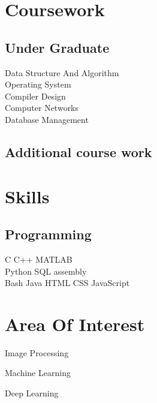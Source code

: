\documentclass[]{deedy-resume-openfont}
\begin{document}
\begin{minipage}[t]{0.32\textwidth}
\section{Coursework}
\subsection{Under Graduate}
Data Structure And Algorithm \\
Operating System \\
Compiler Design \\
Computer Networks \\
Database Management \\

\sectionsep

\subsection{Additional course work}
\sectionsep



\section{Skills}
\subsection{Programming}
\textbullet{} C \textbullet{}  C++ \textbullet{} MATLAB  \\
\textbullet{}Python \textbullet{} SQL \textbullet{} \textbullet{} assembly \\
\textbullet{}Bash \textbullet{} Java \textbullet{} HTML \textbullet{} CSS \textbullet{} JavaScript
\sectionsep

\section{Area Of Interest}
\vspace{\topsep}
\begin{tightemize}
\item Image Processing
\item Machine Learning
\item Deep Learning
\end{tightemize}
\sectionsep

%
%

\end{minipage} 
\end{document}
